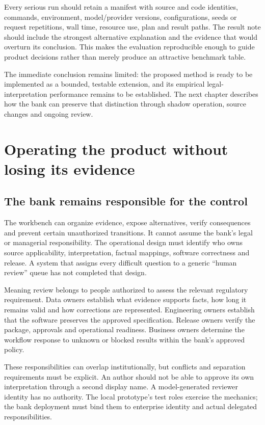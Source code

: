 \documentclass[12pt,a4paper,oneside,openany]{book}
\begin{document}
Every serious run should retain a manifest with source and code identities,
commands, environment, model/provider versions, configurations, seeds or request
repetitions, wall time, resource use, plan and result paths. The result note should
include the strongest alternative explanation and the evidence that would overturn
its conclusion. This makes the evaluation reproducible enough to guide product
decisions rather than merely produce an attractive benchmark table.

The immediate conclusion remains limited: the proposed method is ready to be
implemented as a bounded, testable extension, and its empirical legal-interpretation
performance remains to be established. The next chapter describes how the bank
can preserve that distinction through shadow operation, source changes and
ongoing review.

\chapter{Operating the product without losing its evidence}
\label{ch:operation}

\section{The bank remains responsible for the control}

The workbench can organize evidence, expose alternatives, verify consequences and
prevent certain unauthorized transitions. It cannot assume the bank's legal or
managerial responsibility. The operational design must identify who owns source
applicability, interpretation, factual mappings, software correctness and release.
A system that assigns every difficult question to a generic ``human review'' queue
has not completed that design.

Meaning review belongs to people authorized to assess the relevant regulatory
requirement. Data owners establish what evidence supports facts, how long it
remains valid and how corrections are represented. Engineering owners establish
that the software preserves the approved specification. Release owners verify the
package, approvals and operational readiness. Business owners determine the
workflow response to unknown or blocked results within the bank's approved policy.

These responsibilities can overlap institutionally, but conflicts and separation
requirements must be explicit. An author should not be able to approve its own
interpretation through a second display name. A model-generated reviewer identity
has no authority. The local prototype's test roles exercise the mechanics; the
bank deployment must bind them to enterprise identity and actual delegated
responsibilities.
\end{document}

